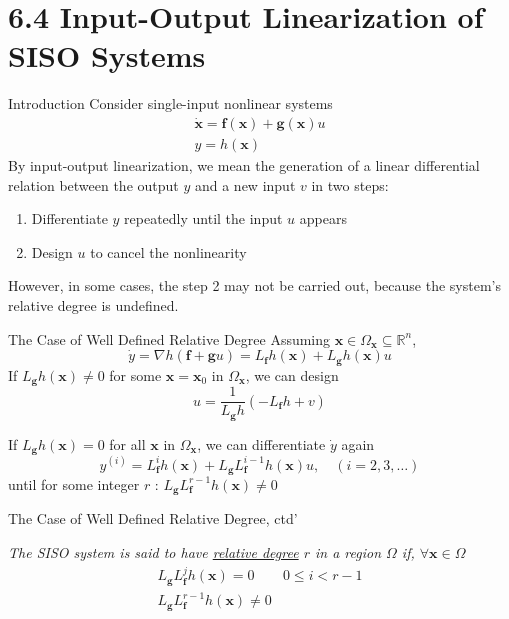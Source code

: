 \documentclass{beamer}
\renewcommand{\vec}[1]{\ensuremath{\boldsymbol{#1}}} %
\begin{document}
\section{6.4  Input-Output Linearization of SISO Systems}

\begin{frame}{Introduction}
    Consider single-input nonlinear systems
        \begin{equation}\label{nonlinear-system}
        \begin{array}{l}{\dot{\vec{x}}=\vec{f}(\vec{x})+\vec{g}(\vec{x}) u} \\ {y=h(\vec{x})}\end{array}
        \end{equation}
    By input-output linearization, we mean the generation of a {\color{red}linear differential relation} between the output $y$ and a new input $v$ in two steps:
    \begin{enumerate}
      \item Differentiate $y$ repeatedly until the input $u$ appears
      \item Design $u$ to cancel the nonlinearity
    \end{enumerate}
    However, in some cases, the step 2 may not be carried out, because the system's {\color{red}relative degree is undefined}.
\end{frame}


\begin{frame}{The Case of Well Defined Relative Degree}
    Assuming $\vec{x} \in \Omega_{\vec{x}} \subseteq \mathbb{R}^{n} $,
    $$
    \dot{y}=\nabla h(\vec{f}+\vec{g} u)=L_{\vec{f}} h(\vec{x})+L_{\vec{g}} h(\vec{x}) u
    $$
    {\color{red}If $L_{\vec{g}}h(\vec{x}) \ne 0$ for some $\vec{x}=\vec{x}_{0}$ in $\Omega_{\vec{x}}$}, we can design
    $$u=\frac{1}{L_{\vec{g}} h}\left(-L_{\vec{f}} h+v\right)$$

    {\color{red}If $L_{\vec{g}}h(\vec{x}) = 0$ for all \vec{x} in $\Omega_{\vec{x}}$}, we can differentiate $\dot{y}$ again
    $$
    y^{(i)}=L_{\vec{f}}^{i} h(\vec{x})+L_{\vec{g}} L_{\vec{f}}^{i-1} h(\vec{x}) u, \quad (i=2,3, \dots)
    $$
    until for some integer $r$ : $L_{\vec{g}} L_{\vec{f}}^{r-1} h(\vec{x}) \neq 0$
\end{frame}

\begin{frame}{The Case of Well Defined Relative Degree, ctd'}
    \begin{definition}[6.7]
    \textit{
    The SISO system is said to have \underline{relative degree} $r$ in a region $\Omega$ if, $\forall \vec{x} \in \Omega$
    $$
    \begin{array}{ll}{L_{\vec{g}} L_{\vec{f}}^{j} h(\vec{x})=0} & {0 \leq i<r-1} \\ {L_{\vec{g}} L_{\vec{f}}^{r-1} h(\vec{x}) \neq 0}\end{array}
    $$
    }
    \end{definition}
\end{frame}
\end{document}
